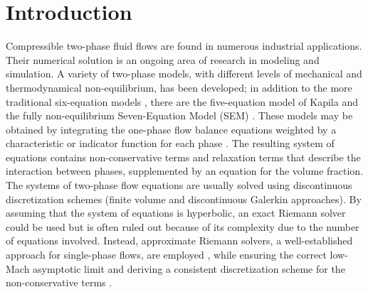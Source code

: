 \documentclass[preprint,10pt]{elsarticle}
\begin{document}
\section{Introduction}\label{sec:intro}
%
Compressible two-phase fluid flows are found in numerous industrial applications. Their numerical solution is an ongoing area of research 
in modeling and simulation. 
A variety of two-phase models, with different levels of mechanical and thermodynamical non-equilibrium, has been developed;
in addition to the more traditional six-equation models \cite{Stadtke}, there are the five-equation model of Kapila \cite{Kapila_2001, GuillardMurrone2003, Saurel_2009} 
and the fully non-equilibrium Seven-Equation Model (SEM) \cite{Berry_1985, BaerNunziato, Saurel_2001b, SEM}.  These models may be obtained
by integrating the one-phase flow balance equations weighted by a characteristic or indicator function for each phase \cite{DrewPassman}.
The resulting system of equations contains non-conservative terms and relaxation terms that 
describe the interaction between phases, supplemented by an equation for the volume fraction. 
The systems of two-phase flow equations are usually solved using discontinuous discretization schemes (finite volume and discontinuous 
Galerkin approaches). By assuming that the system of equations is hyperbolic, an exact Riemann solver could be used but is often ruled 
out because of its complexity due to the number of equations involved. Instead, approximate Riemann solvers, a well-established approach 
for single-phase flows, are employed \cite{Saurel_2001a, Saurel_2001b, Li_2004, Zein_2010, Ambroso_2012},  while ensuring the correct 
low-Mach asymptotic limit and deriving a consistent discretization scheme for the non-conservative terms \cite{Li_2004, Abgrall_2002}.
\end{document}

